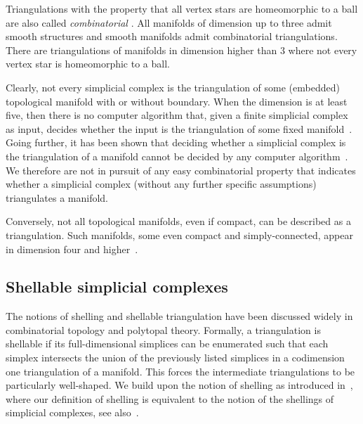 \documentclass[10pt,a4paper]{article}
\begin{document}
\begin{remark}
    Triangulations with the property that all vertex stars are homeomorphic to a ball are also called \emph{combinatorial} \cite[Section~1]{Bagchi2005}.
    All manifolds of dimension up to three admit smooth structures and smooth manifolds admit combinatorial triangulations. 
    There are triangulations of manifolds in dimension higher than $3$ where not every vertex star is homeomorphic to a ball. 
    
    Clearly, not every simplicial complex is the triangulation of some (embedded) topological manifold with or without boundary. 
    When the dimension is at least five, then there is no computer algorithm that, given a finite simplicial complex as input, decides whether the input is the triangulation of some fixed manifold~\cite{chernavsky2006unrecognizability}.
    Going further, it has been shown that deciding whether a simplicial complex is the triangulation of a manifold cannot be decided by any computer algorithm~\cite{poonen2014undecidable}.     
    We therefore are not in pursuit of any easy combinatorial property that indicates whether a simplicial complex (without any further specific assumptions) triangulates a manifold.

    Conversely, not all topological manifolds, even if compact, can be described as a triangulation. 
    Such manifolds, some even compact and simply-connected, appear in dimension four and higher~\cite{akbulut2014casson}.
\end{remark}








\subsection{Shellable simplicial complexes}\label{subsection:shellability}


The notions of shelling and shellable triangulation have been discussed widely in combinatorial topology and polytopal theory. 
Formally, a triangulation is shellable if its full-dimensional simplices can be enumerated such that each simplex intersects the union of the previously listed simplices in a codimension one triangulation of a manifold. 
This forces the intermediate triangulations to be particularly well-shaped. 
We build upon the notion of shelling as introduced in~\cite[Definition 8.1]{ziegler1995lectures},
where our definition of shelling is equivalent to the notion of the shellings of simplicial complexes, see also~\cite[Remark~8.3]{ziegler1995lectures}. 
\end{document}
